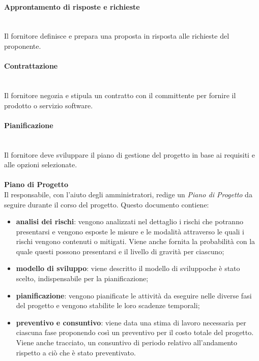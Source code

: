 		\paragraph{Approntamento di risposte e richieste} \mbox{}\\
		Il fornitore definisce e prepara una proposta in risposta alle richieste del 
		proponente.
		\paragraph{Contrattazione} \mbox{}\\
		Il fornitore negozia e stipula un contratto con il committente per fornire il 
		prodotto o servizio software.
		\paragraph{Pianificazione} \mbox{}\\
		Il fornitore deve sviluppare il piano di gestione del progetto in base ai 
		requisiti e alle opzioni selezionate. \\ \\
			\textbf{Piano di Progetto} \mbox{}\\ 
			
			\noindent Il responsabile, con l'aiuto degli amministratori, redige un 
			\textit{Piano di 
				Progetto} da seguire durante il corso del progetto. Questo documento 
				contiene:
			\begin{itemize}
				\item \textbf{analisi dei rischi}: vengono analizzati nel dettaglio i 
				rischi 
				che potranno presentarsi e vengono esposte le misure e le modalità 
				attraverso le 
				quali i rischi vengono contenuti o mitigati. Viene anche fornita la 
				probabilità 
				con la quale questi possono presentarsi e il livello di gravità per 
				ciascuno;
				\item \textbf{modello di sviluppo\glo}: viene descritto il modello di 
				sviluppo\glosp che è stato scelto, indispensabile per la pianificazione;
				\item \textbf{pianificazione}: vengono pianificate le attività da eseguire 
				nelle diverse fasi del progetto e vengono stabilite le loro scadenze 
				temporali;
				\item \textbf{preventivo e consuntivo}: viene data una stima di lavoro 
				necessaria per ciascuna fase proponendo così un preventivo per il costo 
				totale 
				del progetto. Viene anche tracciato, un consuntivo di periodo relativo 
				all'andamento rispetto a ciò che è stato preventivato.
			\end{itemize} \mbox{}\\
			
